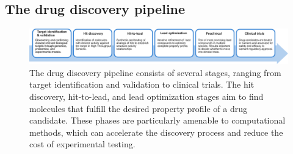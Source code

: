 \subsection{The drug discovery pipeline}
\begin{figure}
	\centering
	\includegraphics[width=\textwidth]{figures/drug-discovery-pipeline_v2.pdf}
	\caption{The drug discovery pipeline consists of several stages, ranging from target
		identification and validation to clinical trials. The hit discovery, hit-to-lead, and lead
		optimization stages aim to find molecules that fulfill the desired property profile of a
		drug candidate. These phases are particularly amenable to computational methods, which can
		accelerate the discovery process and reduce the cost of experimental
		testing.\label{fig:drug-discovery-pipeline}}
\end{figure}

